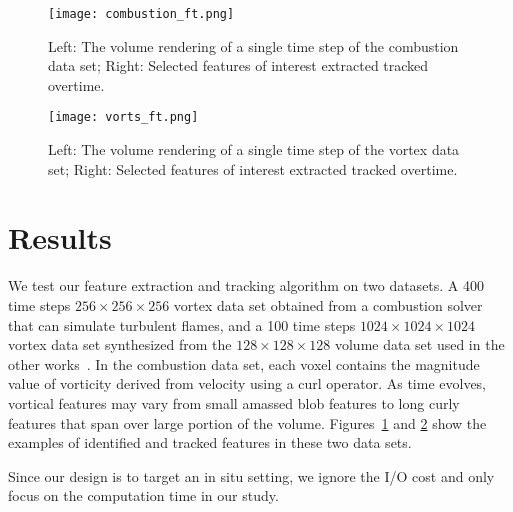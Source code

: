 \begin{figure}[t]
\texttt{[image: combustion\_ft.png]}
\caption{Left: The volume rendering of a single time step of the combustion data set; Right: Selected features of interest extracted tracked overtime.}
\label{fig:combustion-labeled}
\end{figure}

\begin{figure}[t]
\texttt{[image: vorts\_ft.png]}
\caption{Left: The volume rendering of a single time step of the vortex data set; Right: Selected features of interest extracted tracked overtime.}
\label{fig:vorts-tracking-result}
\end{figure}

\section{Results}

We test our feature extraction and tracking algorithm on two datasets. A 400 time steps $256\times256\times256$ vortex data set obtained from a combustion solver that can simulate turbulent flames, and a 100 time steps $1024\times1024\times1024$ vortex data set synthesized from the $128\times128\times128$ volume data set used in the other works~\cite{Silver:1997:TVT:614266.614369, Ji2003, Ji2006}. In the combustion data set, each voxel contains the magnitude value of vorticity derived from velocity using a curl operator. As time evolves, vortical features may vary from small amassed blob features to long curly features that span over large portion of the volume. Figures~\ref{fig:combustion-labeled} and \ref{fig:vorts-tracking-result} show the examples of identified and tracked features in these two data sets.

Since our design is to target an in situ setting, we ignore the I/O cost and only focus on the computation time in our study.


